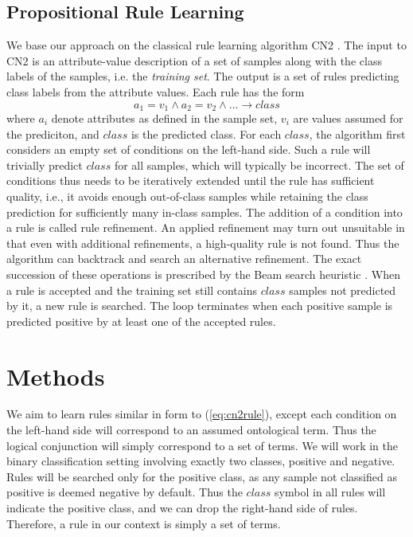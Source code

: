 \documentclass{bmcart}
\begin{document}
\subsection*{Propositional Rule Learning}
We base our approach on the classical rule learning algorithm CN2 \cite{clark1989cn2}. The input to CN2 is an attribute-value description of a set of samples along with the class labels of the samples, i.e. the {\em training set}. The output is a set of rules predicting class labels from the attribute values. Each rule has the form
\begin{equation}\label{eq:cn2rule}
	a_1 = v_1 \wedge a_2=v_2 \wedge  \ldots  \rightarrow {class}
\end{equation}
where $a_i$ denote attributes as defined in the sample set, $v_i$ are values assumed for the prediciton, and ${class}$ is the predicted class. For each ${class}$, the algorithm first considers an empty set of conditions on the left-hand side. Such a rule will trivially predict ${class}$ for all samples, which will typically be incorrect. The set of conditions thus needs to be iteratively extended until the rule has sufficient quality, i.e., it avoids enough out-of-class samples while retaining the class prediction for sufficiently many in-class samples. The addition of a condition into a rule is called rule refinement. An applied refinement may turn out unsuitable in that even with additional refinements, a high-quality rule is not found. Thus the algorithm can backtrack  and search an alternative refinement. The exact succession of these operations is prescribed by the Beam search heuristic \cite{russelNorvig2003:aima}. When a rule is accepted and the training set still contains ${class}$ samples not predicted by it, a new rule is searched. The loop terminates when each positive sample is predicted positive by at least one of the accepted rules.

\section*{Methods}
We aim to learn rules similar in form to (\ref{eq:cn2rule}), except each condition on the left-hand side will correspond to an assumed ontological term. Thus the logical conjunction will simply correspond to a set of terms. We will work in the binary classification setting involving exactly two classes, positive and negative. Rules will be searched only for the positive class, as any sample not classified as positive is deemed negative by default. Thus the ${class}$ symbol in all rules will indicate the positive class, and we can drop the right-hand side of rules. Therefore, a rule in our context is simply a set of terms.
\end{document}
